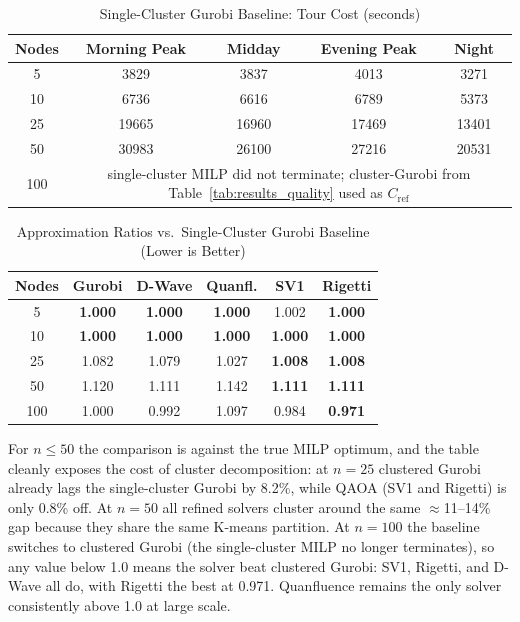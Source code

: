\documentclass[conference]{IEEEtran}
\begin{document}
\begin{table}[htbp]
\caption{Single-Cluster Gurobi Baseline: Tour Cost (seconds)}
\begin{center}
\begin{tabular}{|c|c|c|c|c|}
\hline
\textbf{Nodes} & \textbf{Morning Peak} & \textbf{Midday} & \textbf{Evening Peak} & \textbf{Night} \\
\hline
5   & 3829  & 3837  & 4013  & 3271  \\
\hline
10  & 6736  & 6616  & 6789  & 5373  \\
\hline
25  & 19665 & 16960 & 17469 & 13401 \\
\hline
50  & 30983 & 26100 & 27216 & 20531 \\
\hline
100 & \multicolumn{4}{c|}{single-cluster MILP did not terminate; cluster-Gurobi from Table~\ref{tab:results_quality} used as $C_{\text{ref}}$} \\
\hline
\end{tabular}
\label{tab:single_cluster_baseline}
\end{center}
\end{table}

\begin{table}[htbp]
\caption{Approximation Ratios vs.\ Single-Cluster Gurobi Baseline (Lower is Better)}
\begin{center}
\begin{tabular}{|c|c|c|c|c|c|}
\hline
\textbf{Nodes} & \textbf{Gurobi} & \textbf{D-Wave} & \textbf{Quanfl.} & \textbf{SV1} & \textbf{Rigetti} \\
\hline
5   & \textbf{1.000} & \textbf{1.000} & \textbf{1.000} & 1.002          & \textbf{1.000} \\
\hline
10  & \textbf{1.000} & \textbf{1.000} & \textbf{1.000} & \textbf{1.000} & \textbf{1.000} \\
\hline
25  & 1.082          & 1.079          & 1.027          & \textbf{1.008} & \textbf{1.008} \\
\hline
50  & 1.120          & 1.111          & 1.142          & \textbf{1.111} & \textbf{1.111} \\
\hline
100 & 1.000          & 0.992          & 1.097          & 0.984          & \textbf{0.971} \\
\hline
\end{tabular}
\label{tab:approx_ratio}
\end{center}
\end{table}

For $n \leq 50$ the comparison is against the true MILP optimum, and the table cleanly exposes the cost of cluster decomposition: at $n=25$ clustered Gurobi already lags the single-cluster Gurobi by 8.2\%, while QAOA (SV1 and Rigetti) is only 0.8\% off. At $n=50$ all refined solvers cluster around the same $\approx$11--14\% gap because they share the same K-means partition. At $n=100$ the baseline switches to clustered Gurobi (the single-cluster MILP no longer terminates), so any value below 1.0 means the solver beat clustered Gurobi: SV1, Rigetti, and D-Wave all do, with Rigetti the best at 0.971. Quanfluence remains the only solver consistently above 1.0 at large scale.
\end{document}
